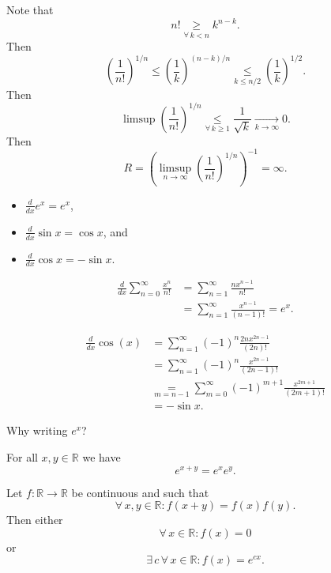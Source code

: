 \documentclass{notes}
\begin{document}
\begin{prf}
  Note that 
  \[
    n! \underset{\forall \, k < n}{\geq} k^{n - k}.
  \]
  Then 
  \[
    \left ( \frac{1}{n!} \right )^{1 / n} \leq \left ( \frac{1}{k} \right )^{(n - k) / n} \underset{k \leq n / 2}{\leq} \left ( \frac{1}{k} \right )^{1 / 2}.
  \]
  Then 
  \[
    \limsup \left ( \frac{1}{n!} \right )^{1 / n} \underset{\forall \, k \geq 1}{\leq} \frac{1}{\sqrt k} \underset{k \to \infty}{\longrightarrow} 0.
  \]
  Then 
  \[
    R = \left ( \limsup_{n \to \infty} \left ( \frac{1}{n!} \right )^{1 / n} \right )^{-1} = \infty.
  \]
\end{prf}

\begin{lem}
  \begin{itemize}
    \item $\frac{d}{dx} e^x = e^x$, 
      
    \item $\frac{d}{dx} \sin x = \cos x$, and 

    \item $\frac{d}{dx} \cos x = -\sin x$.
  \end{itemize}
\end{lem}

\begin{prf}
  \begin{align*}
    \frac{d}{dx} \sum_{n = 0}^\infty \frac{x^n}{n!} &= \sum_{n = 1}^\infty \frac{n x^{n - 1}}{n!} \\ 
    &= \sum_{n = 1}^\infty \frac{x^{n - 1}}{(n - 1)!} = e^x.
  \end{align*}
  
  \begin{align*}
    \frac{d}{dx} \cos(x) &= \sum_{n = 1}^\infty (-1)^n \frac{2 n x^{2 n - 1}}{(2 n)!} \\ 
    &= \sum_{n = 1}^\infty (-1)^n \frac{x^{2 n - 1}}{(2 n - 1)!} \\ 
    &\underset{m = n - 1}{=} \sum_{m = 0}^\infty (-1)^{m + 1} \frac{x^{2 m + 1}}{(2 m + 1)!} \\ 
    &= -\sin x.
  \end{align*}
\end{prf}

Why writing $e^x$?

\begin{lem}
  For all $x, y \in \mathbb R$ we have 
  \[
    e^{x + y} = e^x e^y.
  \]
\end{lem}

\begin{lem}
  Let $f \colon \mathbb R \to \mathbb R$ be continuous and such that 
  \[
    \forall \, x, y \in \mathbb R: f(x + y) = f(x) f(y).
  \]
  Then either
  \[
    \forall \, x \in \mathbb R: f(x) = 0
  \]
  or 
  \[
    \exists \, c \, \forall \, x \in \mathbb R: f(x) = e^{c x}.
  \]
\end{lem}
\end{document}
